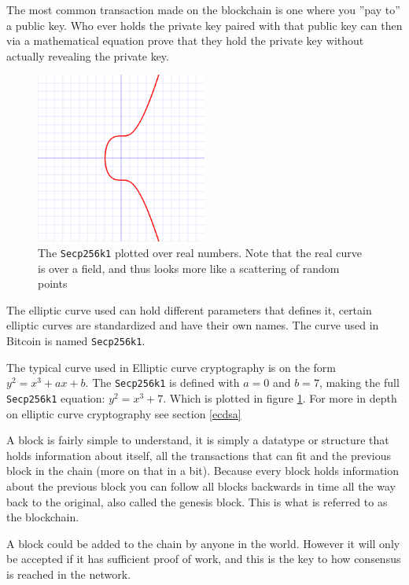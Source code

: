 The most common transaction made on the blockchain is one where you ''pay to''
a public key. Who ever holds the private key paired with that public key can
then via a mathematical equation prove that they hold the private key without
actually revealing the private key.\cite{quantabytes}

\begin{figure}[H]
	\centering
	\includegraphics[width=0.5\textwidth]{introduction/images/Secp256k1.png}
	\caption{The \texttt{Secp256k1} plotted over real numbers. Note that the real
	curve is over a field, and thus looks more like a scattering of random points}
	\label{fig:eccbasic}
\end{figure}

The elliptic curve used can hold different parameters that defines it, certain
elliptic curves are standardized and have their own names. The curve used in
Bitcoin is named \texttt{Secp256k1}.\cite{Secp256k1_def}\cite{antonopoulos_2017}

The typical curve used in Elliptic curve cryptography is on the form
$y^2=x^3+ax+b$. The \texttt{Secp256k1} is defined with $a=0$ and $b=7$, making
the full \texttt{Secp256k1} equation: $y^2=x^3+7$. Which is plotted in figure
\ref*{fig:eccbasic}. For more in depth on elliptic curve cryptography see
section \ref{ecdsa}

A block is fairly simple to understand, it is simply a datatype or structure
that holds information about itself, all the transactions that can fit and the
previous block in the chain (more on that in a bit). Because every block holds
information about the previous block you can follow all blocks backwards in time
all the way back to the original, also called the genesis block.\cite{genesis}
This is what is referred to as the blockchain.

A block could be added to the chain by anyone in the world. However it will only
be accepted if it has sufficient proof of work, and this is the key to how
consensus is reached in the network.\cite{antonopoulos_2017}

